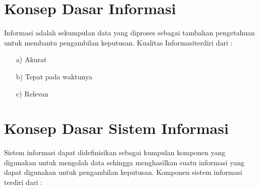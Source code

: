 \documentclass{jtetiproposalskripsi}
\begin{document}
\section{Konsep Dasar Informasi}
Informasi adalah sekumpulan data yang diproses sebagai tambahan pengetahuan untuk membantu pengambilan keputusan. Kualitas Informasiterdiri dari :
\begin{itemize}
\item[a)]Akurat 
\item[b)]Tepat pada waktunya 
\item[c)]Relevan 
\end{itemize}

\section{Konsep Dasar Sistem Informasi}
Sistem informasi dapat didefinisikan sebagai kumpulan komponen yang digunakan untuk mengolah data sehingga menghasilkan suatu informasi yang dapat digunakan untuk pengambilan keputusan. Komponen sistem informasi terdiri dari : 
\end{document}
